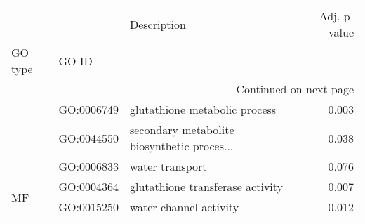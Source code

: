 \begin{longtable}{lllr}
\toprule
   &            &                                  Description &  Adj. p-value \\
GO type & GO ID &                                              &               \\
\midrule
\endhead
\midrule
\multicolumn{4}{r}{{Continued on next page}} \\
\midrule
\endfoot

\bottomrule
\endlastfoot
\multirow{3}{*}{BP} & GO:0006749 &                glutathione metabolic process &         0.003 \\
   & GO:0044550 &  secondary metabolite biosynthetic proces... &         0.038 \\
   & GO:0006833 &                              water transport &         0.076 \\
\cline{1-4}
\multirow{2}{*}{MF} & GO:0004364 &             glutathione transferase activity &         0.007 \\
   & GO:0015250 &                       water channel activity &         0.012 \\
\end{longtable}
